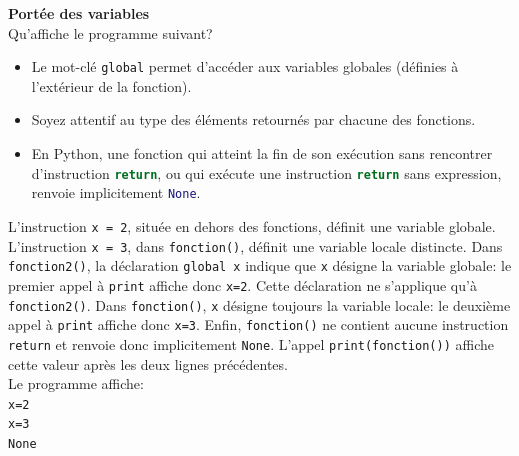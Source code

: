   \begin{Exercice}[5 minutes] [Python] \textbf{Portée des variables} \\
    Qu'affiche le programme suivant? \\

    

    
     \begin{conseil}
        \begin{itemize}
            \item Le mot-clé \lstinline{global} permet d'accéder aux variables globales (définies à l'extérieur de la fonction).
            \item Soyez attentif au type des éléments retournés par chacune des fonctions.
            \item En Python, une fonction qui atteint la fin de son exécution sans rencontrer d'instruction \lstinline[language=python]|return|, ou qui exécute une instruction \lstinline[language=python]|return| sans expression, renvoie implicitement \lstinline[language=python]|None|.
        \end{itemize}
     \end{conseil}
     \begin{solution}
        L'instruction \texttt{x = 2}, située en dehors des fonctions, définit une variable globale. L'instruction \texttt{x = 3}, dans \texttt{fonction()}, définit une variable locale distincte.
        Dans \texttt{fonction2()}, la déclaration \texttt{global x} indique que \texttt{x} désigne la variable globale: le premier appel à \texttt{print} affiche donc \texttt{x=2}.
        Cette déclaration ne s'applique qu'à \texttt{fonction2()}. Dans \texttt{fonction()}, \texttt{x} désigne toujours la variable locale: le deuxième appel à \texttt{print} affiche donc \texttt{x=3}. 
        Enfin, \texttt{fonction()} ne contient aucune instruction \texttt{return} et renvoie donc implicitement \texttt{None}. L'appel \texttt{print(fonction())} affiche cette valeur après les deux lignes précédentes.\\
        
        Le programme affiche:\\
        \texttt{x=2}\\
        \texttt{x=3}\\
        \texttt{None}\\
    \end{solution}
 \end{Exercice}


